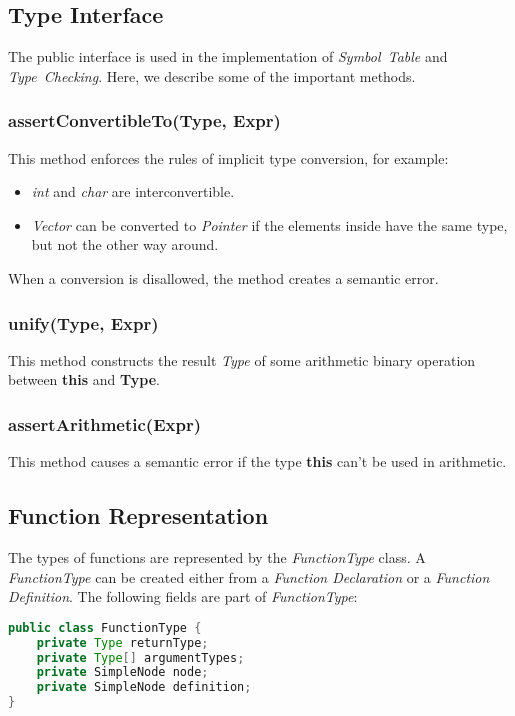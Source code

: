 \documentclass[a4paper,11pt]{article}
\begin{document}
\subsection{Type Interface}
The public interface is used in the implementation of \emph{Symbol~Table} and \emph{Type~Checking}. Here, we describe some of the important methods.

\subsubsection*{assertConvertibleTo(Type, Expr)}
\label{sec:assertConvertibleTo}
This method enforces the rules of implicit type conversion, for example:
\begin{itemize}
\item \emph{int} and \emph{char} are interconvertible.
\item \emph{Vector} can be converted to \emph{Pointer} if the elements inside have the same type, but not the other way around.
\end{itemize}
When a conversion is disallowed, the method creates a semantic error.

\subsubsection*{unify(Type, Expr)}
This method constructs the result \emph{Type} of some arithmetic binary
operation between \textbf{this} and \textbf{Type}.

\subsubsection*{assertArithmetic(Expr)}
This method causes a semantic error if the type \textbf{this} can't be used in
arithmetic.


\subsection{Function Representation}
The types of functions are represented by the \emph{FunctionType} class.  A
\emph{FunctionType} can be created either from a \emph{Function Declaration} or
a \emph{Function Definition}. The following fields are part of
\emph{FunctionType}:

\begin{lstlisting}[language=Java]
public class FunctionType {
    private Type returnType;
    private Type[] argumentTypes;
    private SimpleNode node;
    private SimpleNode definition;
}
\end{lstlisting}
\end{document}
